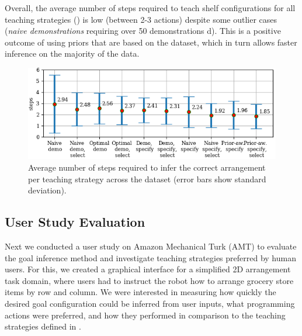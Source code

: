 Overall, the average number of steps required to teach shelf configurations for all teaching strategies () is low (between 2-3 actions) despite some outlier cases (\eg \textit{naive demonstrations} requiring over 50 demonstrations d).
This is a positive outcome of using priors that are based on the dataset, which in turn allows faster inference on the majority of the data.

\begin{figure}[h]
	\includegraphics[width=\linewidth]{figures/avgSteps-certain-data}
	\caption{Average number of steps required to infer the correct arrangement per teaching strategy across the dataset (error bars show standard deviation).}
	\label{fig:avgSteps}
\end{figure}


\subsection{User Study Evaluation}
Next we conducted a user study on Amazon Mechanical Turk (AMT) to evaluate the goal inference method and investigate teaching strategies preferred by human users. 
For this, we created a graphical interface for a simplified 2D arrangement task domain, where users had to instruct the robot how to arrange grocery store items by row and column.
We were interested in measuring how quickly the desired goal configuration could be inferred from user inputs, what programming actions were preferred, and how they performed in comparison to the teaching strategies defined in .

